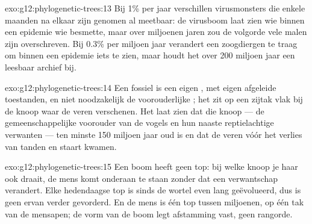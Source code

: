 \begin{solution}{exo:g12:phylogenetic-trees:13}
Bij 1\% per jaar verschillen virusmonsters die enkele maanden na elkaar
zijn genomen al meetbaar: de virusboom laat zien wie binnen een epidemie
wie besmette, maar over miljoenen jaren zou de volgorde vele malen zijn
overschreven. Bij 0.3\% per miljoen jaar verandert een zoogdiergen te
traag om binnen een epidemie iets te zien, maar houdt het over 200 miljoen
jaar een leesbaar archief bij.
\end{solution}

\begin{solution}{exo:g12:phylogenetic-trees:14}
Een fossiel is een eigen , met eigen afgeleide toestanden, en niet
noodzakelijk de voorouderlijke ; het zit op een zijtak vlak bij
de knoop waar de veren verschenen. Het laat zien dat die knoop --- de
gemeenschappelijke voorouder van de vogels en hun naaste reptielachtige
verwanten --- ten minste 150 miljoen jaar oud is en dat de veren vóór het
verlies van tanden en staart kwamen.
\end{solution}

\begin{solution}{exo:g12:phylogenetic-trees:15}
Een boom heeft geen top: bij welke knoop je haar ook draait, de mens komt
onderaan te staan zonder dat een verwantschap verandert. Elke hedendaagse
top is sinds de wortel even lang geëvolueerd, dus is geen ervan verder
gevorderd. En de mens is één top tussen miljoenen, op één tak van de
mensapen; de vorm van de boom legt afstamming vast, geen rangorde.
\end{solution}

